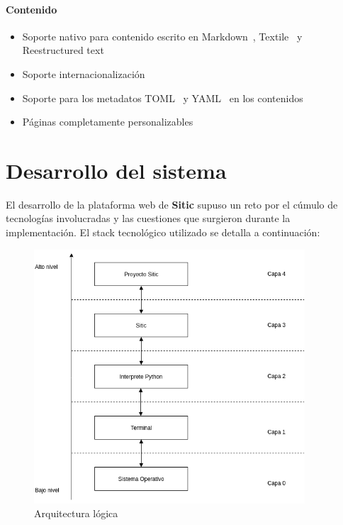 \documentclass[a4paper,12pt]{article}
\begin{document}
\paragraph{Contenido}

\begin{itemize}
\item Soporte nativo para contenido escrito en Markdown~\cite{markdown}, Textile~\cite{textile} y Reestructured text~\cite{restructuredtext}
\item Soporte internacionalización
\item Soporte para los metadatos TOML~\cite{toml} y YAML~\cite{yaml} en los contenidos
\item Páginas completamente personalizables
\end{itemize}


\section{Desarrollo del sistema}

El desarrollo de la plataforma web de \textbf{Sitic} supuso un reto por el cúmulo de tecnologías
involucradas y las cuestiones que surgieron durante la implementación. El stack tecnológico
utilizado se detalla a continuación:

\begin{figure}[htbp]
    \centering
    \includegraphics[width=0.9\textwidth]{img/arquitectura_logica}
    \caption{Arquitectura lógica}
    \label{fig:arquitectura-logica}
\end{figure}
\end{document}
